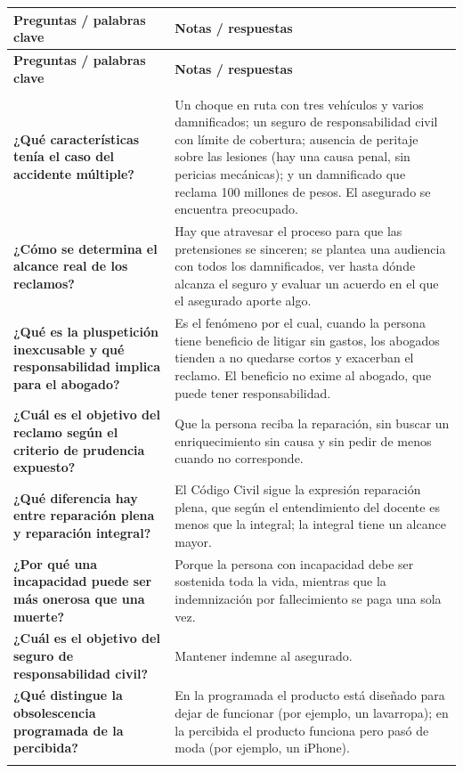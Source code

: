 \documentclass[12pt,oneside]{book}
\newlength{\cornellizq}
\newlength{\cornellder}
\newenvironment{cornell}
{\begin{longtable}{>{\columncolor{gray!10}\raggedright\arraybackslash}p{\cornellizq}>{\raggedright\arraybackslash}p{\cornellder}}
\toprule
\textbf{Preguntas / palabras clave} & \textbf{Notas / respuestas} \\
\midrule
\endfirsthead
\toprule
\textbf{Preguntas / palabras clave} & \textbf{Notas / respuestas} \\
\midrule
\endhead
\midrule
\multicolumn{2}{r}{\footnotesize\itshape Continúa en la página siguiente} \\
\endfoot
\endlastfoot}
{\end{longtable}}
\begin{document}
\begin{cornell}
\textbf{¿Qué características tenía el caso del accidente múltiple?} &
Un choque en ruta con tres vehículos y varios damnificados; un seguro de responsabilidad civil con límite de cobertura; ausencia de peritaje sobre las lesiones (hay una causa penal, sin pericias mecánicas); y un damnificado que reclama 100 millones de pesos. El asegurado se encuentra preocupado. \\
\addlinespace
\midrule[0.3pt]
\textbf{¿Cómo se determina el alcance real de los reclamos?} &
Hay que atravesar el proceso para que las pretensiones se sinceren; se plantea una audiencia con todos los damnificados, ver hasta dónde alcanza el seguro y evaluar un acuerdo en el que el asegurado aporte algo. \\
\addlinespace
\midrule[0.3pt]
\textbf{¿Qué es la pluspetición inexcusable y qué responsabilidad implica para el abogado?} &
Es el fenómeno por el cual, cuando la persona tiene beneficio de litigar sin gastos, los abogados tienden a no quedarse cortos y exacerban el reclamo. El beneficio no exime al abogado, que puede tener responsabilidad. \\
\addlinespace
\midrule[0.3pt]
\textbf{¿Cuál es el objetivo del reclamo según el criterio de prudencia expuesto?} &
Que la persona reciba la reparación, sin buscar un enriquecimiento sin causa y sin pedir de menos cuando no corresponde. \\
\addlinespace
\midrule[0.3pt]
\textbf{¿Qué diferencia hay entre reparación plena y reparación integral?} &
El Código Civil sigue la expresión reparación plena, que según el entendimiento del docente es menos que la integral; la integral tiene un alcance mayor. \\
\addlinespace
\midrule[0.3pt]
\textbf{¿Por qué una incapacidad puede ser más onerosa que una muerte?} &
Porque la persona con incapacidad debe ser sostenida toda la vida, mientras que la indemnización por fallecimiento se paga una sola vez. \\
\addlinespace
\midrule[0.3pt]
\textbf{¿Cuál es el objetivo del seguro de responsabilidad civil?} &
Mantener indemne al asegurado. \\
\addlinespace
\midrule[0.3pt]
\textbf{¿Qué distingue la obsolescencia programada de la percibida?} &
En la programada el producto está diseñado para dejar de funcionar (por ejemplo, un lavarropa); en la percibida el producto funciona pero pasó de moda (por ejemplo, un iPhone). \\
\addlinespace
\midrule
\rowcolor{blue!5}

\end{cornell}
\end{document}
